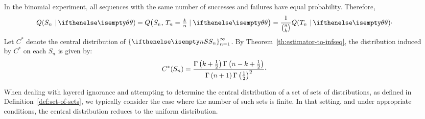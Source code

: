 \begin{example}
    In the binomial experiment, all sequences with the same number of successes and failures have equal probability.
    Therefore,
    \[
        Q(S_n \mid \pv)
        = Q\!\left(S_n,\, T_n = \tfrac{k}{n} \mid \pv\right)
        = \frac{1}{\binom{n}{k}} Q(T_n \mid \pv) \cdot
    \]
    Let $C^*$ denote the central distribution of $\infSeq{S}$.
    By Theorem~\ref{th:estimator-to-infseq}, the distribution induced by $C^*$ on each $S_n$ is given by:
    \begin{equation*}
        C^*(S_n)
        = \frac{\Gamma \left( k+\frac{1}{2} \right) \Gamma \left( n-k+\frac{1}{2} \right)}{\Gamma \left( n+1 \right)\Gamma \left( \frac{1}{2} \right)^2} \cdot
    \end{equation*}
\end{example}

When dealing with layered ignorance and attempting to determine the central distribution of a set of sets of
distributions, as defined in Definition~\ref{def:set-of-sets}, we typically consider the case where the number of
such sets is finite.
In that setting, and under appropriate conditions, the central distribution reduces to the uniform distribution.